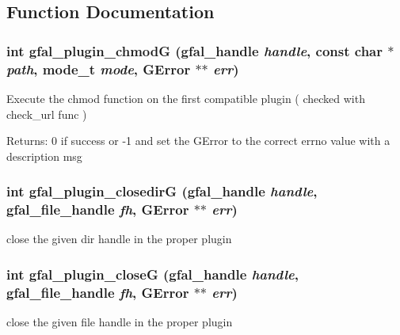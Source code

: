 \subsection{Function Documentation}
\subsubsection{\setlength{\rightskip}{0pt plus 5cm}int gfal\_\-plugin\_\-chmod\-G (gfal\_\-handle {\em handle}, const char $\ast$ {\em path}, mode\_\-t {\em mode}, GError $\ast$$\ast$ {\em err})}\label{gfal__common__plugin_8c_f9780b8c4a097a65b42aee466a9218e0}


Execute the chmod function on the first compatible plugin ( checked with check\_\-url func ) \begin{Desc}
\item[Returns:]0 if success or -1 and set the GError to the correct errno value with a description msg \end{Desc}
\subsubsection{\setlength{\rightskip}{0pt plus 5cm}int gfal\_\-plugin\_\-closedir\-G (gfal\_\-handle {\em handle}, gfal\_\-file\_\-handle {\em fh}, GError $\ast$$\ast$ {\em err})}\label{gfal__common__plugin_8c_980a66f9ea2946189c0d70f13471900f}


close the given dir handle in the proper plugin 
\subsubsection{\setlength{\rightskip}{0pt plus 5cm}int gfal\_\-plugin\_\-close\-G (gfal\_\-handle {\em handle}, gfal\_\-file\_\-handle {\em fh}, GError $\ast$$\ast$ {\em err})}\label{gfal__common__plugin_8c_13d1db9798e5a830c745e2f909a484f4}


close the given file handle in the proper plugin 
